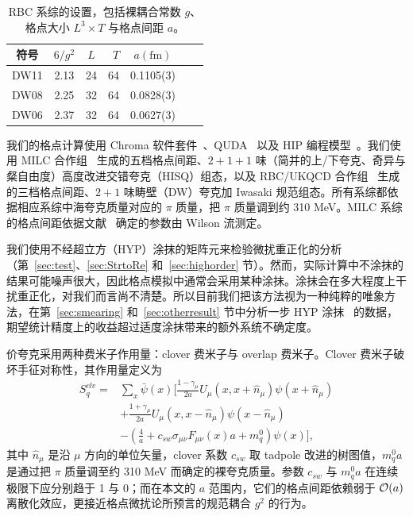 \begin{table}[htbp]
  \centering
  \begin{tabular}{c|ccrccc}
  \toprule
 符号 & $6/g^2$ & $L$ & $T$ &  $a(\mathrm{fm})$\\
\hline
DW11 & 2.13 &24 & 64  & 0.1105(3) \\
\hline
DW08 & 2.25 &32 & 64  & 0.0828(3) \\
\hline
DW06 & 2.37 &32 & 64  & 0.0627(3) \\
\hline
  \end{tabular}
  \caption{RBC 系综的设置，包括裸耦合常数 $g$、格点大小 $L^3\times T$ 与格点间距 $a$。}
  \label{tab:lattice2}
\end{table}

我们的格点计算使用 Chroma 软件套件~\cite{Edwards:2004sx}、QUDA~\cite{Clark:2009wm,Babich:2011np,Clark:2016rdz} 以及 HIP 编程模型~\cite{Bi:2020wpt}。我们使用 MILC 合作组~\cite{Bazavov:2012xda} 生成的五档格点间距、$2+1+1$ 味（简并的上/下夸克、奇异与粲自由度）高度改进交错夸克（HISQ）组态，以及 RBC/UKQCD 合作组~\cite{Blum:2014tka} 生成的三档格点间距、$2+1$ 味畴壁（DW）夸克加 Iwasaki 规范组态。所有系综都依据相应系综中海夸克质量对应的 $\pi$ 质量，把 $\pi$ 质量调到约 310 MeV。MILC 系综的格点间距依据文献~\cite{Miller:2020evg} 确定的参数由 Wilson 流测定。

我们使用不经超立方（HYP）涂抹的矩阵元来检验微扰重正化的分析（第~\ref{sec:test}、\ref{sec:StrtoRe} 和~\ref{sec:highorder} 节）。然而，实际计算中不涂抹的结果可能噪声很大，因此格点模拟中通常会采用某种涂抹。涂抹会在多大程度上干扰重正化，对我们而言尚不清楚。所以目前我们把该方法视为一种纯粹的唯象方法，在第~\ref{sec:smearing} 和~\ref{sec:otherresult} 节中分析一步 HYP 涂抹~\cite{Hasenfratz:2001hp} 的数据，期望统计精度上的收益超过适度涂抹带来的额外系统不确定度。

价夸克采用两种费米子作用量：clover 费米子与 overlap 费米子。Clover 费米子破坏手征对称性，其作用量定义为
\begin{align}\label{eq:clover}
S^{clv}_{q}=&\sum_{x}\bar{\psi}(x)\bigg[\frac{1-\gamma_{\mu}}{2a}U_{\mu}(x,x+\hat{n}_{\mu})\psi(x+\hat{n}_{\mu})\nonumber\\
&+\frac{1+\gamma_{\mu}}{2a}U_{\mu}(x,x-\hat{n}_{\mu})\psi(x-\hat{n}_{\mu})\nonumber\\
&-\left(\frac{4}{a}+c_{sw}\sigma_{\mu\nu} F_{\mu\nu}(x)a+m_q^0\right)\psi(x)\bigg],
\end{align}
其中 $\hat{n}_{\mu}$ 是沿 $\mu$ 方向的单位矢量，clover 系数 $c_{sw}$ 取 tadpole 改进的树图值，$m^0_{q}a$ 是通过把 $\pi$ 质量调至约 310 MeV 而确定的裸夸克质量。参数 $c_{sw}$ 与 $m^0_{q}a$ 在连续极限下应分别趋于 1 与 0；而在本文的 $a$ 范围内，它们的格点间距依赖弱于 ${\cal O}(a)$ 离散化效应，更接近格点微扰论所预言的规范耦合 $g^2$ 的行为。

